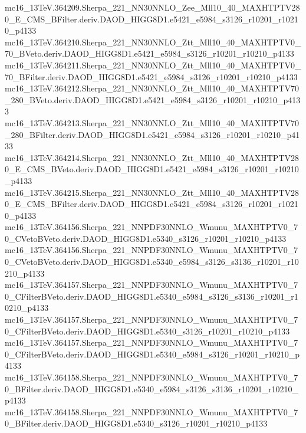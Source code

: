 \begin{footnotesize}
mc16\_13TeV.364209.Sherpa\_221\_NN30NNLO\_Zee\_Mll10\_40\_MAXHTPTV280\_E\_CMS\_BFilter.deriv.DAOD\_HIGG8D1.e5421\_e5984\_s3126\_r10201\_r10210\_p4133 \\
mc16\_13TeV.364210.Sherpa\_221\_NN30NNLO\_Ztt\_Mll10\_40\_MAXHTPTV0\_70\_BVeto.deriv.DAOD\_HIGG8D1.e5421\_e5984\_s3126\_r10201\_r10210\_p4133 \\
mc16\_13TeV.364211.Sherpa\_221\_NN30NNLO\_Ztt\_Mll10\_40\_MAXHTPTV0\_70\_BFilter.deriv.DAOD\_HIGG8D1.e5421\_e5984\_s3126\_r10201\_r10210\_p4133 \\
mc16\_13TeV.364212.Sherpa\_221\_NN30NNLO\_Ztt\_Mll10\_40\_MAXHTPTV70\_280\_BVeto.deriv.DAOD\_HIGG8D1.e5421\_e5984\_s3126\_r10201\_r10210\_p4133 \\
mc16\_13TeV.364213.Sherpa\_221\_NN30NNLO\_Ztt\_Mll10\_40\_MAXHTPTV70\_280\_BFilter.deriv.DAOD\_HIGG8D1.e5421\_e5984\_s3126\_r10201\_r10210\_p4133 \\
mc16\_13TeV.364214.Sherpa\_221\_NN30NNLO\_Ztt\_Mll10\_40\_MAXHTPTV280\_E\_CMS\_BVeto.deriv.DAOD\_HIGG8D1.e5421\_e5984\_s3126\_r10201\_r10210\_p4133 \\
mc16\_13TeV.364215.Sherpa\_221\_NN30NNLO\_Ztt\_Mll10\_40\_MAXHTPTV280\_E\_CMS\_BFilter.deriv.DAOD\_HIGG8D1.e5421\_e5984\_s3126\_r10201\_r10210\_p4133 \\
mc16\_13TeV.364156.Sherpa\_221\_NNPDF30NNLO\_Wmunu\_MAXHTPTV0\_70\_CVetoBVeto.deriv.DAOD\_HIGG8D1.e5340\_s3126\_r10201\_r10210\_p4133 \\
mc16\_13TeV.364156.Sherpa\_221\_NNPDF30NNLO\_Wmunu\_MAXHTPTV0\_70\_CVetoBVeto.deriv.DAOD\_HIGG8D1.e5340\_e5984\_s3126\_s3136\_r10201\_r10210\_p4133 \\
mc16\_13TeV.364157.Sherpa\_221\_NNPDF30NNLO\_Wmunu\_MAXHTPTV0\_70\_CFilterBVeto.deriv.DAOD\_HIGG8D1.e5340\_e5984\_s3126\_s3136\_r10201\_r10210\_p4133 \\
mc16\_13TeV.364157.Sherpa\_221\_NNPDF30NNLO\_Wmunu\_MAXHTPTV0\_70\_CFilterBVeto.deriv.DAOD\_HIGG8D1.e5340\_s3126\_r10201\_r10210\_p4133 \\
mc16\_13TeV.364157.Sherpa\_221\_NNPDF30NNLO\_Wmunu\_MAXHTPTV0\_70\_CFilterBVeto.deriv.DAOD\_HIGG8D1.e5340\_e5984\_s3126\_r10201\_r10210\_p4133 \\
mc16\_13TeV.364158.Sherpa\_221\_NNPDF30NNLO\_Wmunu\_MAXHTPTV0\_70\_BFilter.deriv.DAOD\_HIGG8D1.e5340\_e5984\_s3126\_s3136\_r10201\_r10210\_p4133 \\
mc16\_13TeV.364158.Sherpa\_221\_NNPDF30NNLO\_Wmunu\_MAXHTPTV0\_70\_BFilter.deriv.DAOD\_HIGG8D1.e5340\_s3126\_r10201\_r10210\_p4133 \\

\end{footnotesize}
